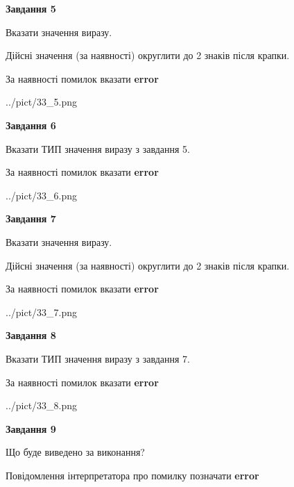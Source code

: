 \documentclass[11pt, ukrainian]{article}
\begin{document}
{\begin {large}
{\begin {center}\textbf{Завдання 5}\end {center}}\par
Вказати значення виразу. \par
Дійсні значення (за наявності) округлити до 2 знаків після крапки. \par
За наявності помилок вказати \textbf{error}

\begin{center}
	{../pict/33_5.png}
\end{center}
\newpage

{\begin {center}\textbf{Завдання 6}\end {center}}\par
Вказати ТИП значення виразу з завдання 5. \par
За наявності помилок вказати \textbf{error}

\begin{center}
	{../pict/33_6.png}
\end{center}
\newpage

{\begin {center}\textbf{Завдання 7}\end {center}}\par
Вказати значення виразу. \par
Дійсні значення (за наявності) округлити до 2 знаків після крапки. \par
За наявності помилок вказати \textbf{error}

\begin{center}
	{../pict/33_7.png}
\end{center}
\newpage

{\begin {center}\textbf{Завдання 8}\end {center}}\par
Вказати ТИП значення виразу з завдання 7. \par
За наявності помилок вказати \textbf{error}

\begin{center}
	{../pict/33_8.png}
\end{center}
\newpage

{\begin {center}\textbf{Завдання 9}\end {center}}\par
Що буде виведено за виконання? \par
Повідомлення інтерпретатора про помилку позначати \textbf{error}


\end{large}}
\end{document}
